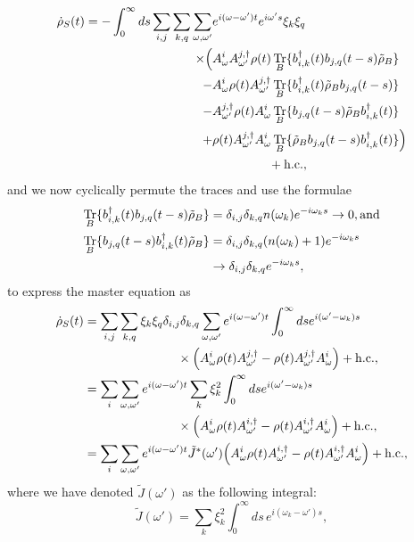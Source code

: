 \documentclass[11pt,a4paper,article,oneside]{memoir}
\DeclareMathOperator{\Hc}{h.c.}  \DeclareMathOperator{\Tr}{Tr}
\newcommand{\Gap}{\,\,\,\,\,\,\,\,\,} \newcommand{\Ua}{\uparrow}
\begin{document}
\begin{align}
  \dot{\rho}_S(t)=-\int^\infty_0ds\sum_{i,j}\sum_{k,q}\sum_{\omega,\omega'}&e^{i(\omega-\omega')t}e^{i\omega's}\xi_k\xi_q
  \notag\\ \times\Big(& A^i_\omega
  A^{j,\dagger}_{\omega'}\rho(t)\Tr_B\{b^\dagger_{i,k}(t)b_{j,q}(t-s)\tilde{\rho}_B\}
  \notag \\ -
  &A^i_\omega\rho(t)A^{j,\dagger}_{\omega'}\Tr_B\{b^\dagger_{i,k}(t)\tilde{\rho}_Bb_{j,q}(t-s)\}\notag
  \\ -&
  A^{j,\dagger}_{\omega'}\rho(t)A^i_\omega\Tr_B\{b_{j,q}(t-s)\tilde{\rho}_Bb^\dagger_{i,k}(t)\}\notag
  \\ +&\rho(t)A^{j,\dagger}_{\omega'}A^i_\omega\Tr_B\{\tilde{\rho}_Bb_{j,q}(t-s)b^\dagger_{i,k}(t)\}\Big)\notag\\ &\Gap\Gap\Gap+\Hc,
\end{align}
and we now cyclically permute the traces and use the formulae
\begin{align}
  \Tr_B\{b^\dagger_{i,k}(t)b_{j,q}(t-s)\tilde{\rho}_B\}&=\delta_{i,j}\delta_{k,q}n(\omega_k)e^{-i\omega_ks}\rightarrow 0, \text{and}\notag\\
  \Tr_B\{b_{j,q}(t-s)b^\dagger_{i,k}(t)\tilde{\rho}_B\}&=\delta_{i,j}\delta_{k,q}(n(\omega_k)+1)e^{-i\omega_ks}\notag\\
  &\rightarrow \delta_{i,j}\delta_{k,q}e^{-i\omega_ks},
\end{align}
to express the master equation as
\begin{align}
  \dot{\rho}_S(t)&=\sum_{i,j}\sum_{k,q}\xi_k\xi_q \delta_{i,j}\delta_{k,q}\sum_{\omega,\omega'}e^{i(\omega-\omega')t}\int^\infty_0dse^{i(\omega'-\omega_k)s}\notag\\
  &\Gap\Gap\Gap\Gap\Gap\times\Big(A^i_\omega\rho(t)A^{j,\dagger}_{\omega'}-\rho(t)A^{j,\dagger}_{\omega'}A^i_\omega\Big)+\Hc, \notag\\
  &=\sum_{i}\sum_{\omega,\omega'}e^{i(\omega-\omega')t}\sum_{k}\xi^2_k\int^\infty_0dse^{i(\omega'-\omega_k)s}\notag \\
  &\Gap\Gap\Gap\Gap\Gap\times\Big(A^i_\omega\rho(t)A^{i,\dagger}_{\omega'}-\rho(t)A^{i,\dagger}_{\omega'}A^i_\omega\Big)+\Hc, \notag\\
  &=\sum_{i}\sum_{\omega,\omega'}e^{i(\omega-\omega')t}\tilde{J}^*(\omega')\Big(A^i_\omega\rho(t)A^{i,\dagger}_{\omega'}-\rho(t)A^{i,\dagger}_{\omega'}A^i_\omega\Big)+\Hc,
\end{align}
where we have denoted $\tilde{J}(\omega')$ as the following integral:
\begin{equation}
  \tilde{J}(\omega')=\sum_k\xi^2_k\int_0^\infty ds\, e^{i(\omega_k-\omega')s},
\end{equation}
\end{document}
